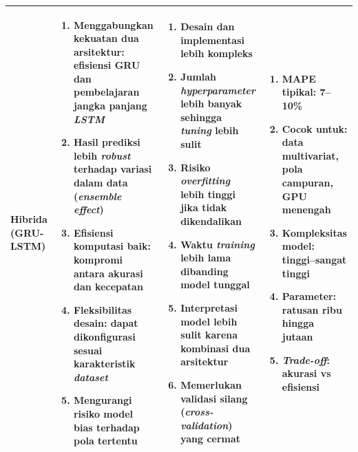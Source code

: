 \begin{longtable}{|p{1.8cm}|p{3.5cm}|p{3.8cm}|p{3cm}|}
\textbf{Hibrida (GRU-LSTM)} &
\begin{enumerate}[leftmargin=*,itemsep=0.5pt,topsep=1pt,partopsep=0pt]
  \item Menggabungkan kekuatan dua arsitektur: efisiensi GRU dan pembelajaran jangka panjang \textit{LSTM}
  \item Hasil prediksi lebih \textit{robust} terhadap variasi dalam data (\textit{ensemble effect})
  \item Efisiensi komputasi baik: kompromi antara akurasi dan kecepatan
  \item Fleksibilitas desain: dapat dikonfigurasi sesuai karakteristik \textit{dataset}
  \item Mengurangi risiko model bias terhadap pola tertentu
\end{enumerate}
&
\begin{enumerate}[leftmargin=*,itemsep=0.5pt,topsep=1pt,partopsep=0pt]
  \item Desain dan implementasi lebih kompleks
  \item Jumlah \textit{hyperparameter} lebih banyak sehingga \textit{tuning} lebih sulit
  \item Risiko \textit{overfitting} lebih tinggi jika tidak dikendalikan
  \item Waktu \textit{training} lebih lama dibanding model tunggal
  \item Interpretasi model lebih sulit karena kombinasi dua arsitektur
  \item Memerlukan validasi silang (\textit{cross-validation}) yang cermat
\end{enumerate}
&
\begin{enumerate}[leftmargin=*,itemsep=0.5pt,topsep=1pt,partopsep=0pt]
  \item MAPE tipikal: 7--10\%
  \item Cocok untuk: data multivariat, pola campuran, GPU menengah
  \item Kompleksitas model: tinggi--sangat tinggi
  \item Parameter: ratusan ribu hingga jutaan
  \item \textit{Trade-off}: akurasi vs efisiensi
\end{enumerate}
\tabularnewline
\hline


\end{longtable}
